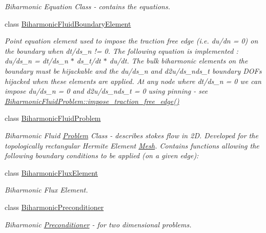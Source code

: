 \begin{DoxyCompactItemize}
\begin{DoxyCompactList}\small\item\em Biharmonic Equation Class -\/ contains the equations. \end{DoxyCompactList}\item 
class \hyperlink{classoomph_1_1BiharmonicFluidBoundaryElement}{Biharmonic\+Fluid\+Boundary\+Element}
\begin{DoxyCompactList}\small\item\em Point equation element used to impose the traction free edge (i.\+e. du/dn = 0) on the boundary when dt/ds\+\_\+n != 0. The following equation is implemented \+: du/ds\+\_\+n = dt/ds\+\_\+n $\ast$ ds\+\_\+t/dt $\ast$ du/dt. The bulk biharmonic elements on the boundary must be hijackable and the du/ds\+\_\+n and d2u/ds\+\_\+nds\+\_\+t boundary D\+O\+Fs hijacked when these elements are applied. At any node where dt/ds\+\_\+n = 0 we can impose du/ds\+\_\+n = 0 and d2u/ds\+\_\+nds\+\_\+t = 0 using pinning -\/ see \hyperlink{classoomph_1_1BiharmonicFluidProblem_a1cc57555bbd0ceef1d93010c133ac597}{Biharmonic\+Fluid\+Problem\+::impose\+\_\+traction\+\_\+free\+\_\+edge()} \end{DoxyCompactList}\item 
class \hyperlink{classoomph_1_1BiharmonicFluidProblem}{Biharmonic\+Fluid\+Problem}
\begin{DoxyCompactList}\small\item\em Biharmonic Fluid \hyperlink{classoomph_1_1Problem}{Problem} Class -\/ describes stokes flow in 2D. Developed for the topologically rectangular Hermite Element \hyperlink{classoomph_1_1Mesh}{Mesh}. Contains functions allowing the following boundary conditions to be applied (on a given edge)\+: \end{DoxyCompactList}\item 
class \hyperlink{classoomph_1_1BiharmonicFluxElement}{Biharmonic\+Flux\+Element}
\begin{DoxyCompactList}\small\item\em Biharmonic Flux Element. \end{DoxyCompactList}\item 
class \hyperlink{classoomph_1_1BiharmonicPreconditioner}{Biharmonic\+Preconditioner}
\begin{DoxyCompactList}\small\item\em Biharmonic \hyperlink{classoomph_1_1Preconditioner}{Preconditioner} -\/ for two dimensional problems. \end{DoxyCompactList}\item 

\end{DoxyCompactItemize}
